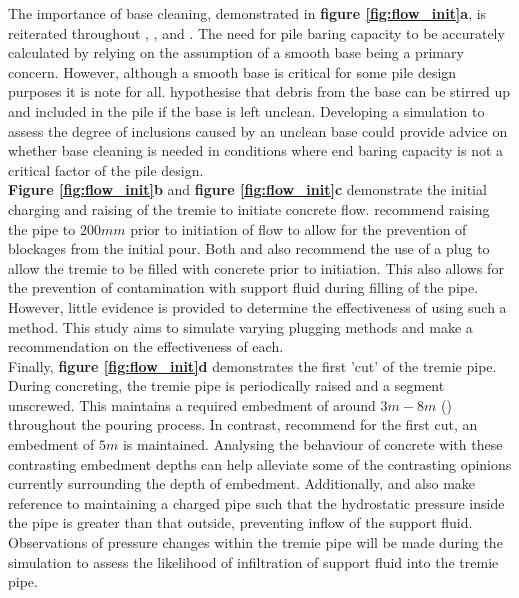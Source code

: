 \noindent
The importance of base cleaning, demonstrated in {\bfseries figure \ref{fig:flow_init}a}, is reiterated throughout \citeauthor{BS1536}, , and . The need for pile baring capacity to be accurately calculated by relying on the assumption of a smooth base being a primary concern. However, although a smooth base is critical for some pile design purposes it is note for all.  hypothesise that debris from the base can be stirred up and included in the pile if the base is left unclean. Developing a simulation to assess the degree of inclusions caused by an unclean base could provide advice on whether base cleaning is needed in conditions where end baring capacity is not a critical factor of the pile design.\\

\noindent
{\bfseries
Figure \ref{fig:flow_init}b} and {\bfseries figure \ref{fig:flow_init}c}  demonstrate the initial charging and raising of the tremie to initiate concrete flow.  recommend raising the pipe to $200mm$ prior to initiation of flow to allow for the prevention of blockages from the initial pour. Both  and  also recommend the use of a plug to allow the tremie to be filled with concrete prior to initiation. This also allows for the prevention of contamination with support fluid during filling of the pipe. However, little evidence is provided to determine the effectiveness of using such a method. This study aims to simulate varying plugging methods and make a recommendation on the effectiveness of each.\\

\noindent
Finally, {\bfseries figure \ref{fig:flow_init}d}  demonstrates the first 'cut' of the tremie pipe. During concreting, the tremie pipe is periodically raised and a segment unscrewed. This maintains a required embedment of around $3m-8m$ (\citeauthor{BS1536}) throughout the pouring process. In contrast,  recommend for the first cut, an embedment of $5m$ is maintained. Analysing the behaviour of concrete with these contrasting embedment depths can help alleviate some of the contrasting opinions currently surrounding the depth of embedment. Additionally,  and  also make reference to maintaining a charged pipe such that the hydrostatic pressure inside the pipe is greater than that outside, preventing inflow of the support fluid. Observations of pressure changes within the tremie pipe will be made during the simulation to assess the likelihood of infiltration of support fluid into the tremie pipe.

